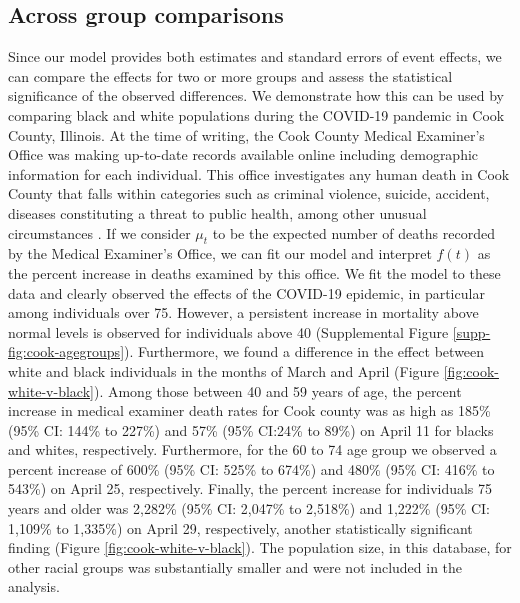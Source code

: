 \documentclass[11pt]{article}
\begin{document}
 

\subsection{Across group comparisons}
\label{subsec:group-comparison}
Since our model provides both estimates and standard errors of event effects, we can compare the effects for two or more groups and assess the statistical significance of the observed differences. We demonstrate how this can be used by comparing black and white populations during the COVID-19 pandemic in Cook County, Illinois. At the time of writing, the Cook County Medical Examiner's Office was making up-to-date records available online including demographic information for each individual. This office investigates any human death in Cook County that falls within categories such as criminal violence, suicide, accident, diseases constituting a threat to public health, among other unusual circumstances \cite{cookcovid19}. If we consider $\mu_t$ to be the expected number of deaths recorded by the Medical Examiner's Office, we can fit our model and interpret $f(t)$ as the percent increase in deaths examined by this office. We fit the model to these data and clearly observed the effects of the COVID-19 epidemic, in particular among individuals over 75. However, a persistent increase in mortality above normal levels is observed for individuals above 40 (Supplemental Figure \ref{supp-fig:cook-agegroups}).  Furthermore, we found a difference in the effect  between white and black individuals in the months of March and April (Figure \ref{fig:cook-white-v-black}). Among those between 40 and 59 years of age, the percent increase in medical examiner death rates for Cook county was as high as 185\% (95\% CI: 144\% to 227\%) and 57\% (95\% CI:24\% to 89\%) on April 11 for blacks and whites, respectively. Furthermore, for the 60 to 74 age group we observed a percent increase of 
600\% (95\% CI: 525\% to 674\%) and 480\% (95\% CI: 416\% to 543\%) on April 25, respectively. Finally, the percent increase for individuals 75 years and older was 2,282\% (95\% CI: 2,047\% to 2,518\%) and 1,222\% (95\% CI: 1,109\% to 1,335\%) on April 29, respectively, another statistically significant finding (Figure \ref{fig:cook-white-v-black}).  The population size, in this database, for other racial groups was substantially smaller and were not included in the analysis.
\end{document}

